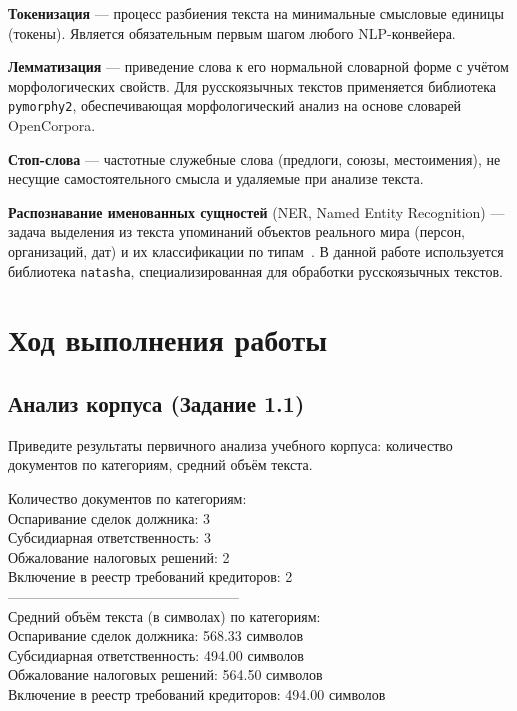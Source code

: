 \documentclass[12pt, a4paper]{report}
\newcommand{\placeholder}[2][Вставьте результат]{%
  \begin{tcolorbox}[placeholderbox, title={#2}]
    #1
  \end{tcolorbox}%
  \vspace{4pt}%
}
\begin{document}
\textbf{Токенизация} — процесс разбиения текста на минимальные смысловые единицы (токены).
Является обязательным первым шагом любого NLP-конвейера.

\textbf{Лемматизация} — приведение слова к его нормальной словарной форме с учётом
морфологических свойств. Для русскоязычных текстов применяется библиотека \texttt{pymorphy2},
обеспечивающая морфологический анализ на основе словарей OpenCorpora.

\textbf{Стоп-слова} — частотные служебные слова (предлоги, союзы, местоимения),
не несущие самостоятельного смысла и удаляемые при анализе текста.

\textbf{Распознавание именованных сущностей} (NER, Named Entity Recognition) —
задача выделения из текста упоминаний объектов реального мира (персон, организаций,
дат) и их классификации по типам~\cite{lec1}. В данной работе используется библиотека
\texttt{natasha}, специализированная для обработки русскоязычных текстов.

\chapter{Ход выполнения работы}

\section{Анализ корпуса (Задание 1.1)}

Приведите результаты первичного анализа учебного корпуса: количество документов по
категориям, средний объём текста.

\placeholder[Количество документов по категориям:\\
Оспаривание сделок должника: 3\\
Субсидиарная ответственность: 3\\
Обжалование налоговых решений: 2\\
Включение в реестр требований кредиторов: 2\\
--------------------------------------------------\\
Средний объём текста (в символах) по категориям:\\
Оспаривание сделок должника: 568.33 символов\\
Субсидиарная ответственность: 494.00 символов\\
Обжалование налоговых решений: 564.50 символов\\
Включение в реестр требований кредиторов: 494.00 символов]{Результаты анализа корпуса}
\end{document}
